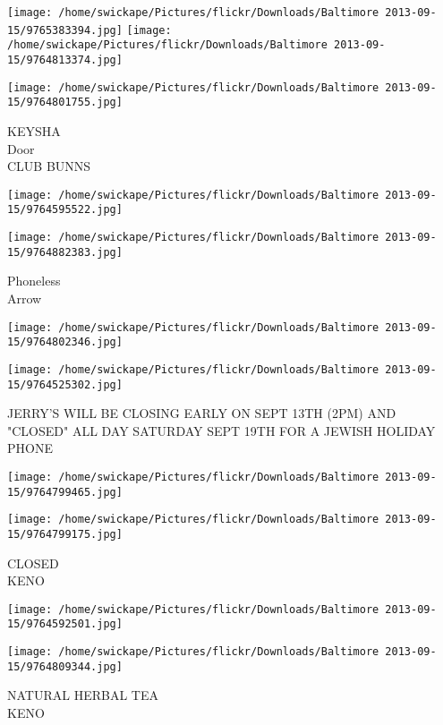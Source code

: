 \documentclass[10pt,letterpaper]{article}
\begin{document}
\texttt{[image: /home/swickape/Pictures/flickr/Downloads/Baltimore 2013-09-15/9765383394.jpg]}
\texttt{[image: /home/swickape/Pictures/flickr/Downloads/Baltimore 2013-09-15/9764813374.jpg]}

\vspace{0.25in}
\texttt{[image: /home/swickape/Pictures/flickr/Downloads/Baltimore 2013-09-15/9764801755.jpg]}

KEYSHA\\
Door\\
CLUB BUNNS
\pagebreak

\texttt{[image: /home/swickape/Pictures/flickr/Downloads/Baltimore 2013-09-15/9764595522.jpg]}

\vspace{0.25in}
\texttt{[image: /home/swickape/Pictures/flickr/Downloads/Baltimore 2013-09-15/9764882383.jpg]}

Phoneless\\
Arrow
\pagebreak

\texttt{[image: /home/swickape/Pictures/flickr/Downloads/Baltimore 2013-09-15/9764802346.jpg]}

\vspace{0.25in}
\texttt{[image: /home/swickape/Pictures/flickr/Downloads/Baltimore 2013-09-15/9764525302.jpg]}

JERRY'S WILL BE CLOSING EARLY ON SEPT 13TH (2PM) AND "CLOSED" ALL DAY SATURDAY SEPT 19TH FOR A JEWISH HOLIDAY\\
PHONE
\pagebreak

\texttt{[image: /home/swickape/Pictures/flickr/Downloads/Baltimore 2013-09-15/9764799465.jpg]}

\vspace{0.25in}
\texttt{[image: /home/swickape/Pictures/flickr/Downloads/Baltimore 2013-09-15/9764799175.jpg]}

CLOSED\\
KENO
\pagebreak

\texttt{[image: /home/swickape/Pictures/flickr/Downloads/Baltimore 2013-09-15/9764592501.jpg]}

\vspace{0.25in}
\texttt{[image: /home/swickape/Pictures/flickr/Downloads/Baltimore 2013-09-15/9764809344.jpg]}

NATURAL HERBAL TEA\\
KENO
\pagebreak
\end{document}
